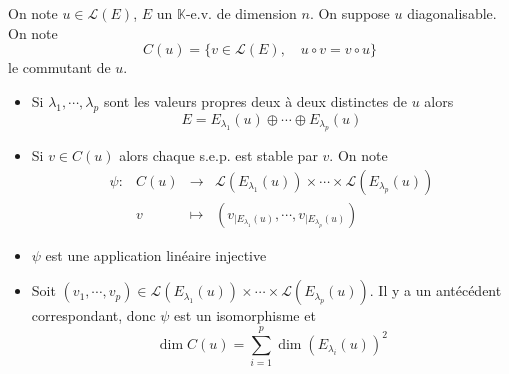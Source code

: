On note $u\in\mathcal L(E)$, $E$ un $\mathbb K$-e.v. de dimension $n$. On suppose $u$ diagonalisable. On note \[
    C(u)=\{v\in\mathcal L(E), \quad u\circ v=v\circ u\}
\]
le commutant de $u$.

\begin{itemize}
    \item Si $\lambda_1, \cdots, \lambda_p$ sont les valeurs propres deux à deux distinctes de $u$ alors \[
            E=E_{\lambda_1}(u)\oplus \cdots \oplus E_{\lambda_p}(u)
        \]
    \item Si $v\in C(u)$ alors chaque s.e.p. est stable par $v$. On note \[
            \begin{matrix}
                \psi: & C(u) & \longrightarrow & \mathcal L(E_{\lambda_1}(u))\times \cdots \times \mathcal L(E_{\lambda_p}(u))\\
                      &v &\longmapsto & \left( v_{|E_{\lambda_1}(u)}, \cdots, v_{|E_{\lambda_p}(u)} \right)
            \end{matrix}
        \]
    \item $\psi$ est une application linéaire injective
    \item Soit $(v_1, \cdots, v_p)\in \mathcal L(E_{\lambda_1}(u))\times \cdots \times \mathcal L(E_{\lambda_p}(u))$. Il y a un antécédent correspondant, donc $\psi$ est un isomorphisme et \[
            \dim C(u)=\sum_{i=1}^p\dim(E_{\lambda_i}(u))^2
        \]
\end{itemize}
\endchapter
